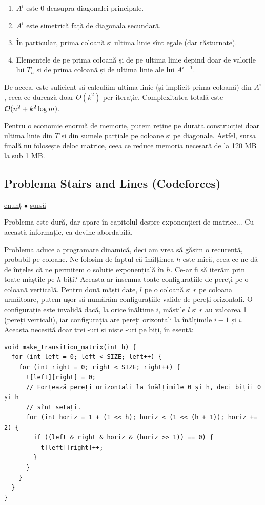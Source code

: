 \documentclass[../main.tex]{subfiles}
\begin{document}
\begin{enumerate}
  \item $A^i$ este 0 deasupra diagonalei principale.
  \item $A^i$ este simetrică față de diagonala secundară.
  \item În particular, prima coloană și ultima linie sînt egale (dar răsturnate).
  \item Elementele de pe prima coloană și de pe ultima linie depind doar de valorile lui $T_n$ și de prima coloană și de ultima linie ale lui $A^{i-1}$.
\end{enumerate}

De aceea, este suficient să calculăm ultima linie (și implicit prima coloană) din $A^i$, ceea ce durează doar $O(k^2)$ per iterație. Complexitatea totală este $\mathcal{O}(n^2 + k^2 \log m)$.

Pentru o economie enormă de memorie, putem reține pe durata construcției doar ultima linie din $T$ și din sumele parțiale pe coloane și pe diagonale. Astfel, sursa finală nu folosește deloc matrice, ceea ce reduce memoria necesară de la 120 MB la sub 1 MB.

\subsection{Problema Stairs and Lines (Codeforces)}
\label{problem:stairs-and-lines}

\href{https://codeforces.com/contest/498/problem/E}{enunț}
$\bullet$
\hyperref[code:stairs-and-lines]{sursă}

Problema este dură, dar apare în capitolul despre exponențieri de matrice... Cu această informație, ea devine abordabilă.

Problema aduce a programare dinamică, deci am vrea să găsim o recurență, probabil pe coloane. Ne folosim de faptul că înălțimea $h$ este mică, ceea ce ne dă de înțeles că ne permitem o soluție exponențială în $h$. Ce-ar fi să iterăm prin toate măștile pe $h$ biți? Aceasta ar însemna toate configurațiile de pereți pe o coloană verticală. Pentru două măști date, $l$ pe o coloană și $r$ pe coloana următoare, putem ușor să numărăm configurațiile valide de pereți orizontali. O configurație este invalidă dacă, la orice înălțime $i$, măștile $l$ și $r$ au valoarea 1 (pereți verticali), iar configurația are pereți orizontali la înălțimile $i-1$ și $i$. Aceasta necesită doar trei -uri și niște -uri pe biți, în esență:

\begin{verbatim}
void make_transition_matrix(int h) {
  for (int left = 0; left < SIZE; left++) {
    for (int right = 0; right < SIZE; right++) {
      t[left][right] = 0;
      // Forțează pereți orizontali la înălțimile 0 și h, deci biții 0 și h
      // sînt setați.
      for (int horiz = 1 + (1 << h); horiz < (1 << (h + 1)); horiz += 2) {
        if ((left & right & horiz & (horiz >> 1)) == 0) {
          t[left][right]++;
        }
      }
    }
  }
}
\end{verbatim}
\end{document}
